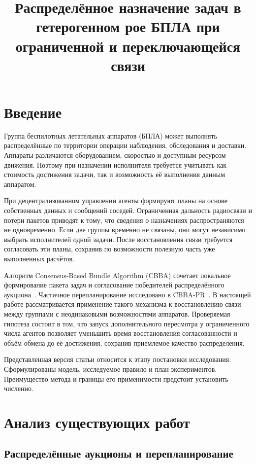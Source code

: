 \documentclass{misisarticle}
\title{Распределённое назначение задач в гетерогенном рое БПЛА при ограниченной и переключающейся связи}
\begin{document}
\maketitle

\section{Введение}

Группа беспилотных летательных аппаратов (БПЛА) может выполнять распределённые по территории операции наблюдения, обследования и доставки. Аппараты различаются оборудованием, скоростью и доступным ресурсом движения. Поэтому при назначении исполнителя требуется учитывать как стоимость достижения задачи, так и возможность её выполнения данным аппаратом.

При децентрализованном управлении агенты формируют планы на основе собственных данных и сообщений соседей. Ограниченная дальность радиосвязи и потери пакетов приводят к тому, что сведения о назначениях распространяются не одновременно. Если две группы временно не связаны, они могут независимо выбрать исполнителей одной задачи. После восстановления связи требуется согласовать эти планы, сохранив по возможности полезную часть уже выполненных расчётов.

Алгоритм Consensus-Based Bundle Algorithm (CBBA) сочетает локальное формирование пакета задач и согласование победителей распределённого аукциона~\cite{choi2009}. Частичное перепланирование исследовано в CBBA-PR~\cite{buckman2019}. В настоящей работе рассматривается применение такого механизма к восстановлению связи между группами с неодинаковыми возможностями аппаратов. Проверяемая гипотеза состоит в том, что запуск дополнительного пересмотра у ограниченного числа агентов позволяет уменьшить время восстановления согласованности и объём обмена до её достижения, сохранив приемлемое качество распределения.

Представленная версия статьи относится к этапу постановки исследования. Сформулированы модель, исследуемое правило и план экспериментов. Преимущество метода и границы его применимости предстоит установить численно.

\section{Анализ существующих работ}

\subsection{Распределённые аукционы и перепланирование}
\end{document}
